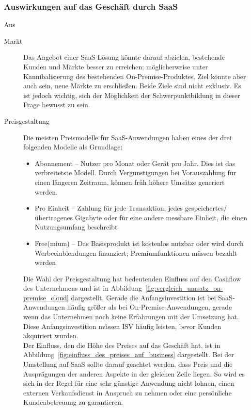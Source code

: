 \subsubsection{Auswirkungen auf das Geschäft durch SaaS}
Aus  
\begin{description}
	\item[Markt] Das Angebot einer SaaS-Lösung könnte darauf abzielen, 
bestehende Kunden und Märkte besser zu erreichen; möglicherweise unter 
Kannibalisierung des bestehenden On-Premise-Produktes. Ziel könnte aber auch 
sein, neue Märkte zu erschließen. Beide Ziele sind nicht exklusiv. Es ist 
jedoch wichtig, sich der Möglichkeit der Schwerpunktbildung in dieser Frage 
bewusst zu sein.
	\item[Preisgestaltung] Die meisten Preismodelle für SaaS-Anwendungen 
haben eines der drei folgenden Modelle als Grundlage: 
	\begin{itemize}
		\item Abonnement -- Nutzer pro Monat oder Gerät pro Jahr. Dies 
ist das verbreitetste Modell. Durch Vergünstigungen bei Vorauszahlung für einen 
längeren Zeitraum, können früh höhere Umsätze generiert werden.
		\item Pro Einheit -- Zahlung für jede Transaktion, jedes 
gespeichertes/übertragenes Gigabyte oder für eine andere messbare Einheit, die 
einen Nutzungsumfang beschreibt
		\item Free(mium) -- Das Basisprodukt ist kostenlos nutzbar oder 
wird durch Werbeeinblendungen finanziert; Premiumfunktionen müssen bezahlt 
werden
	\end{itemize}
	Die Wahl der Preisgestaltung hat bedeutenden Einfluss auf den Cashflow 
des Unternehmens und ist in 
Abbildung~\ref{fig:vergleich_umsatz_on-premise_cloud} dargestellt. Gerade die 
Anfangsinvestition ist bei SaaS-Anwendungen häufig größer als bei 
On-Premise-Anwendungen, gerade wenn das Unternehmen noch keine Erfahrungen mit 
der Umsetzung hat. Diese Anfangsinvestition müssen ISV häufig leisten, bevor 
Kunden akquiriert wurden. \\
Der Einfluss, den die Höhe des Preises auf das Geschäft hat, ist in 
Abbildung~\ref{fig:einfluss_des_preises_auf_business} dargestellt. Bei der 
Umstellung auf SaaS sollte darauf geachtet werden, dass Preis und die 
Ausprägungen der anderen Aspekte in der gleichen Zeile liegen. So wird es sich 
in der Regel für eine sehr günstige Anwendung nicht lohnen, einen externen 
Verkaufsdienst in Anspruch zu nehmen oder eine persönliche Kundenbetreuung zu 
garantieren. \\



\end{description}
